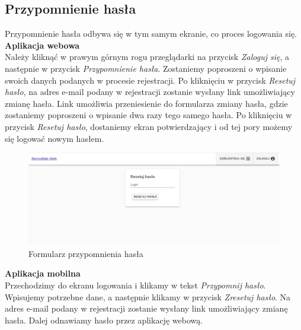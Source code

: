 \documentclass{article}
\begin{document}
\subsection{Przypomnienie hasła}
Przypomnienie hasła odbywa się w tym samym ekranie, co proces logowania się.
\\

\textbf{Aplikacja webowa} \\
Należy kliknąć w prawym górnym rogu przeglądarki na przycisk \emph{Zaloguj się}, a następnie w przycisk \emph{Przypomnienie hasła}. Zostaniemy poproszeni o wpisanie swoich danych podanych w procesie rejestracji. Po kliknięciu w przycisk \emph{Resetuj hasło}, na adres e-mail podany w rejestracji zostanie wysłany link umożliwiający zmianę hasła. Link umożliwia przeniesienie do formularza zmiany hasła, gdzie zostaniemy poproszeni o wpisanie dwa razy tego samego hasła. Po kliknięciu w przycisk \emph{Resetuj hasło}, dostaniemy ekran potwierdzający i od tej pory możemy się logować nowym hasłem.
\begin{figure}[H]
    \centering
    \includegraphics[width=1\linewidth]{images/web/reset_password.png}
    \caption{Formularz przypomnienia hasła}
    \label{fig:test3_label}
\end{figure}

\textbf{Aplikacja mobilna} \\
Przechodzimy do ekranu logowania i klikamy w tekst \emph{Przypomnij hasło}.
Wpisujemy potrzebne dane, a następnie klikamy w przycisk \emph{Zresetuj hasło}. Na adres e-mail podany w rejestracji zostanie wysłany link umożliwiający zmianę hasła.
Dalej odnawiamy hasło przez aplikację webową.
\end{document}

